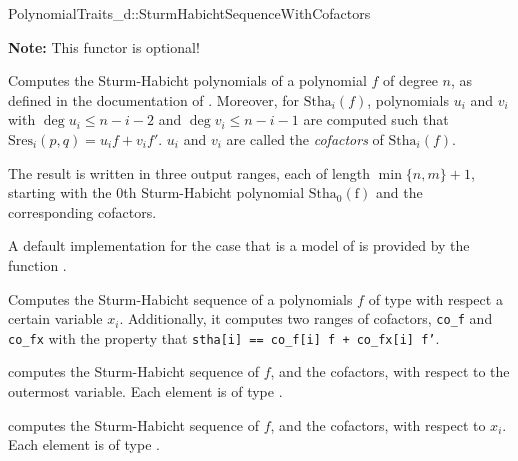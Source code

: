 \begin{ccRefConcept}{PolynomialTraits_d::SturmHabichtSequenceWithCofactors}

\textbf{Note:} This functor is optional!

\ccDefinition

Computes the Sturm-Habicht polynomials of a polynomial $f$ of degree $n$, 
as defined in the documentation of .
Moreover, for $\mathrm{Stha}_i(f)$, polynomials $u_i$ and $v_i$
with $\deg u_i\leq n-i-2$ and $\deg v_i\leq n-i-1$ are computed 
such that $\mathrm{Sres}_i(p,q)=u_i f + v_i f'$. $u_i$ and $v_i$ are called
the \emph{cofactors} of $\mathrm{Stha}_i(f)$.
 
The result is written in three output ranges, each of length $\min\{n,m\}+1$, 
starting with the $0$th Sturm-Habicht polynomial $\mathrm{Stha_0(f)}$ 
and the corresponding cofactors.

A default implementation for the case that 
is a model of 
is provided by the function .

Computes the Sturm-Habicht sequence of a polynomials $f$ of type 
 with respect a certain variable $x_i$.
Additionally, it computes two ranges of cofactors, {\tt co\_f} and {\tt co\_fx}
with the property that {\tt stha[i] == co\_f[i] f + co\_fx[i] f'}.

\ccOperations
{}
         { computes the Sturm-Habicht sequence of $f$, and the cofactors, 
           with respect to the outermost variable. Each element is of type
           .}

         { computes the Sturm-Habicht sequence of $f$, and the cofactors, 
           with respect to $x_i$. Each element is of type
           .}


\ccSeeAlso

\\
\\
\\
\\

\end{ccRefConcept}
